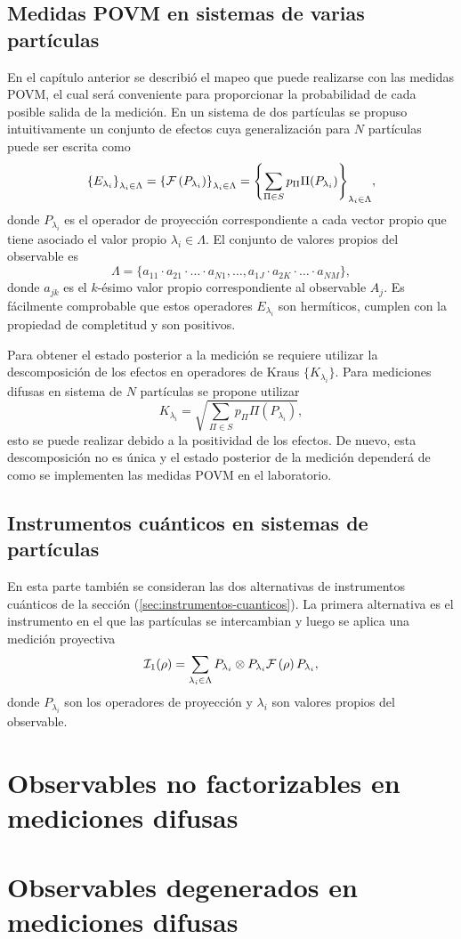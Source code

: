 \subsection{Medidas POVM en sistemas de varias partículas}
En el capítulo anterior se describió el mapeo que puede realizarse con las medidas POVM, el cual será conveniente para proporcionar la probabilidad de cada posible salida de la medición. En un sistema de dos partículas se propuso intuitivamente un conjunto de efectos cuya generalización para $N$ partículas puede ser escrita como \begin{equation}\label{eq:effectsSetNp}
    {\{E_{\lambda_i}\}}_{\lambda_i \in \Lambda}={\{\mathcal{F}\left(P_{\lambda_i}\right)\}}_{\lambda_i \in \Lambda}={\left\{\sum_{\Pi \in S} p_\Pi \Pi(P_{\lambda_i})\right\}}_{\lambda_i \in \Lambda},
\end{equation}  
donde $P_{\lambda_i}$ es el operador de proyección correspondiente a cada vector propio que tiene asociado el valor propio $\lambda_i\in \Lambda$. El conjunto de valores propios del observable es \begin{equation}\label{eq:lambdaeigenvalues}
    \Lambda=\{a_{11}\cdot a_{21}\cdot \hdots \cdot a_{N1},\hdots,a_{1J}\cdot a_{2K}\cdot \hdots \cdot a_{NM}\},
\end{equation} donde $a_{jk}$ es el $k$-ésimo valor propio correspondiente al observable $A_j$.  Es fácilmente comprobable que estos operadores $E_{\lambda_i}$ son hermíticos, cumplen con la propiedad de completitud y son positivos.


Para obtener el estado posterior a la medición se requiere utilizar la descomposición de los efectos en operadores de Kraus $\{K_{\lambda_i}\}$. Para mediciones difusas en sistema de $N$ partículas se propone utilizar \begin{equation}
    K_{\lambda_i}=\sqrt{\sum_{\Pi \in S} p_\Pi \Pi(P_{\lambda_i})},
\end{equation} esto se puede realizar debido a la positividad de los efectos. De nuevo, esta descomposición no es única y el estado posterior de la medición dependerá de como se implementen las medidas POVM en el laboratorio. 



\subsection{Instrumentos cuánticos en sistemas de \texorpdfstring{}{N} partículas}
En esta parte también se consideran las dos alternativas de instrumentos cuánticos de la sección ({\ref{sec:instrumentos-cuanticos}}). La primera alternativa es el instrumento en el que las partículas se intercambian y luego se aplica una medición proyectiva \begin{equation}\label{eq:1instrumentnp}
    \mathcal{I}_1(\rho)=\sum_{\lambda_i \in \Lambda }P_{\lambda_i}\otimes P_{\lambda_i}\mathcal{F}\left(\rho\right)P_{\lambda_i},
\end{equation} donde $P_{\lambda_i}$ son los operadores de proyección y $\lambda_i$ son valores propios del observable.

\section{Observables no factorizables en mediciones difusas}
\section{Observables degenerados en mediciones difusas}

